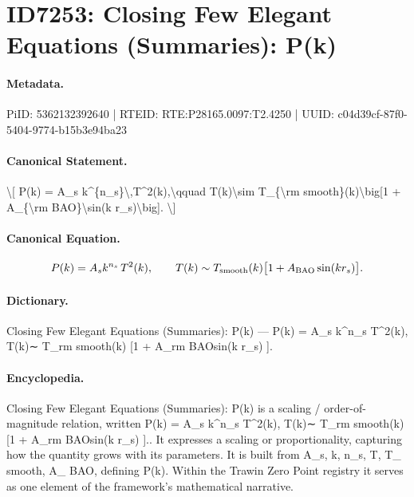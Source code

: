 \section*{ID7253: Closing Few Elegant Equations (Summaries): P(k)}
\paragraph{Metadata.}
PiID: 5362132392640 | RTEID: RTE:P28165.0097:T2.4250 | UUID: c04d39cf-87f0-5404-9774-b15b3e94ba23

\paragraph{Canonical Statement.}
\textbackslash{}[ P(k) = A\_s k\textasciicircum{}\{n\_s\}\textbackslash{},T\textasciicircum{}2(k),\textbackslash{}qquad T(k)\textbackslash{}sim T\_\{\textbackslash{}rm smooth\}(k)\textbackslash{}big[1 + A\_\{\textbackslash{}rm BAO\}\textbackslash{}sin(k r\_s)\textbackslash{}big]. \textbackslash{}]

\paragraph{Canonical Equation.}
\[
P(k) = A_s k^{n_s}\,T^2(k),\qquad T(k)\sim T_{\rm smooth}(k)\big[1 + A_{\rm BAO}\sin(k r_s)\big].
\]

\paragraph{Dictionary.}
Closing Few Elegant Equations (Summaries): P(k) — P(k) = A\_s k\textasciicircum{}n\_s T\textasciicircum{}2(k), T(k)∼ T\_rm smooth(k) [1 + A\_rm BAOsin(k r\_s) ].

\paragraph{Encyclopedia.}
Closing Few Elegant Equations (Summaries): P(k) is a scaling / order-of-magnitude relation, written P(k) = A\_s k\textasciicircum{}n\_s T\textasciicircum{}2(k), T(k)∼ T\_rm smooth(k) [1 + A\_rm BAOsin(k r\_s) ].. It expresses a scaling or proportionality, capturing how the quantity grows with its parameters. It is built from A\_s, k, n\_s, T, T\_ smooth, A\_ BAO, defining P(k). Within the Trawin Zero Point registry it serves as one element of the framework's mathematical narrative.
